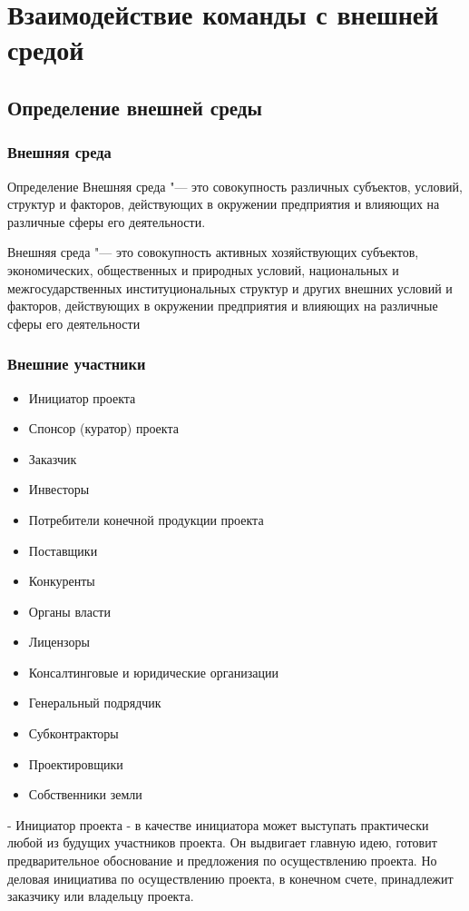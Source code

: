 \documentclass{../industrial-development}
\begin{document}
\section{Взаимодействие команды с внешней средой}

\subsection{Определение внешней среды}
\begin{frame} \frametitle{Внешняя среда}
	\begin{block}{Определение}
		\alert{Внешняя среда} "--- это совокупность различных субъектов, условий, структур и факторов, действующих в окружении предприятия и влияющих на различные сферы его деятельности.
	\end{block}
\end{frame}

\lecturenotes Внешняя среда "--- это совокупность активных хозяйствующих субъектов, экономических, общественных и природных условий, национальных и межгосударственных институциональных структур и других внешних условий и факторов, действующих в окружении предприятия и влияющих на различные сферы его деятельности

\begin{frame} \frametitle{Внешние участники}
	\begin{itemize}
		\item Инициатор проекта
		\item Спонсор (куратор) проекта
		\item Заказчик
		\item Инвесторы
		\item Потребители конечной продукции проекта
		\item Поставщики
		\item Конкуренты
		\item Органы власти
		\item Лицензоры
		\item Консалтинговые и юридические организации 
		\item Генеральный подрядчик
		\item Субконтракторы
		\item Проектировщики
		\item Собственники земли
	\end{itemize}
\end{frame}

\lecturenotes
- Инициатор проекта - в качестве инициатора может выступать практически любой из будущих участников проекта. Он выдвигает главную идею, готовит предварительное обоснование и предложения по осуществлению проекта. Но деловая инициатива по осуществлению проекта, в конечном счете, принадлежит заказчику или владельцу проекта.
\end{document}
